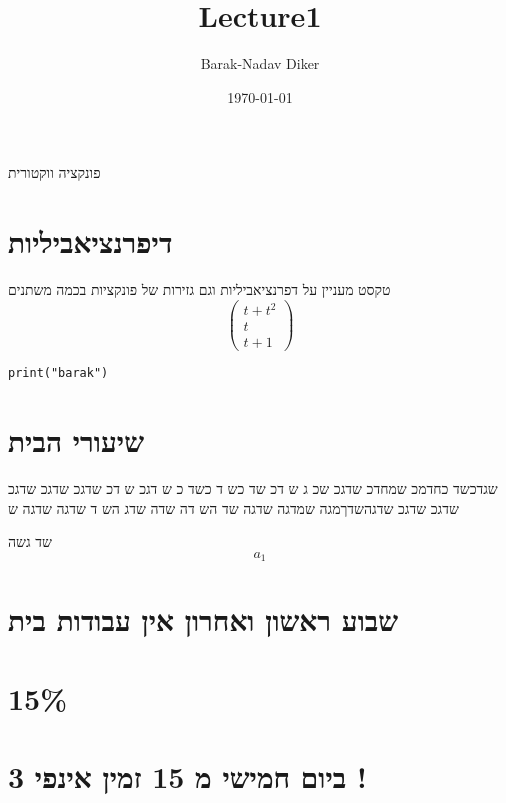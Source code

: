\documentclass[11pt]{article}
\author{Barak-Nadav Diker}
\date{\today}
\title{Lecture1}
\begin{document}
\maketitle
פונקציה ווקטורית
\section*{דיפרנציאביליות}
\label{sec:orgd22faf5}
טקסט מעניין על דפרנציאביליות וגם גזירות של פונקציות בכמה משתנים
\begin{equation}
\begin{pmatrix}
t + t^2 \\
t \\
t + 1 
\end{pmatrix}
\end{equation}



\begin{verbatim}
print("barak")
\end{verbatim}
\section*{שיעורי הבית}
\label{sec:org271428a}
שגדכשד כחדמכ שמחדכ שדגכ שכ
ג ש
דכ שד כש
ד כשד
כ ש
דגכ ש
דכ
שדגכ שדגכ שדגכ שדגכ שדגכ שדגהשדךמגה שמדגה שדגה שד
הש
דה שדה שדג הש
ד
שדגה שדגה ש

שד גשה
\begin{equation}
a_1
\end{equation}
\section*{שבוע ראשון ואחרון אין עבודות בית}
\label{sec:orga24ebda}
\section*{15\%}
\label{sec:org5bdde9d}
\section*{ביום חמישי מ 15 זמין אינפי 3 !}
\label{sec:org3f8d822}
\end{document}
